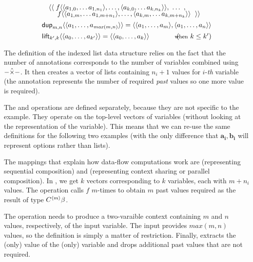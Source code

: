 \begin{example}
\begin{equation*}
\begin{array}{l}
\quad \langle\langle\; f \langle \langle a_{1,0}, \ldots a_{1,{n_1}} \rangle, \ldots, \langle a_{k,0}, \ldots a_{k,{n_k}} \rangle \rangle, ~\ldots~, \\[-0.25em]
\quad ~~~\; f \langle \langle a_{1,m}, \ldots a_{1,m+{n_1}} \rangle, \ldots, \langle a_{k,m}, \ldots a_{k,m+{n_k}} \rangle \rangle~\; \rangle\rangle
\\[0.45em]
\textnormal{\sffamily dup}_{m, n} \langle \langle a_1, \ldots, a_{\mathit{max}(m,n)} \rangle \rangle =
   \langle \langle a_1, \ldots, a_m \rangle, \langle a_1, \ldots, a_n \rangle \rangle
\\[0.45em]
\textnormal{\sffamily lift}_{k', k} \langle\langle a_0, \ldots, a_{k'} \rangle\rangle = 
  \langle\langle a_0, \ldots, a_k \rangle\rangle \qquad\qquad(\hspace{-0.95em}\textnormal{\footnotesize when}~k\leq k')
\end{array}
\end{equation*}
\end{example}

The definition of the indexed list data structure relies on the fact that the number of annotations
corresponds to the number of variables combined using $-\hat{\times}-$. It then creates a vector of lists
containing $n_i+1$ values for $i$-\textit{th} variable (the annotation represents the number of 
required \emph{past} values so one more value is required).

The  and  operations are defined separately, because they are not specific
to the example. They operate on the top-level vectors of variables (without looking at the 
representation of the variable). This means that we can re-use the same definitions for the following
two examples (with the only difference that $\mathbf{a_i}, \mathbf{b_i}$ will represent options
rather than lists).

The mappings that explain how data-flow computations work are  (representing sequential
composition) and  (representing context sharing or parallel composition). In ,
we get $k$ vectors corresponding to $k$ variables, each with $m+n_i$ values. The operation calls 
$f$ $m$-times to obtain $m$ past values required as the result of type $C^{\langle m \rangle}\beta$.

The  operation needs to produce a two-varaible context containing $m$ and $n$ values,
respectively, of the input variable. The input provides $\mathit{max}(m, n)$ values, so the definition
is simply a matter of restriction. Finally,  extracts the (only) value of the (only) variable
and  drops additional past values that are not required.

